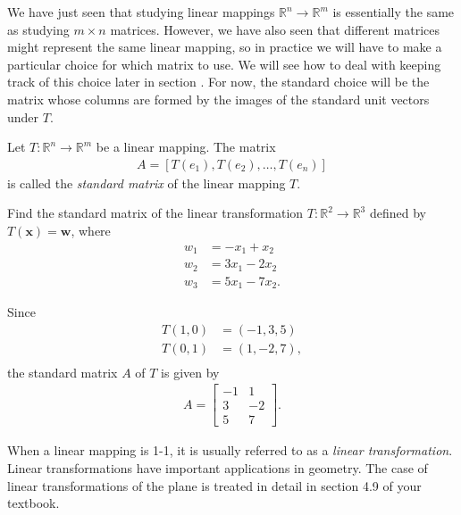 \documentclass[12pt,letterpaper,reqno]{article}
\numberwithin{equation}{section}
\newcommand{\fixme}[1]{{\color{orange}{[#1]}}}
\begin{document}
We have just seen that studying linear mappings $\mathbb{R}^n \to \mathbb{R}^m$ is essentially the same as studying $m \times n$ matrices. However, we have also seen that different matrices might represent the same linear mapping, so in practice we will have to make a particular choice for which matrix to use. We will see how to deal with keeping track of this choice later in section \fixme{Add link.}. For now, the standard choice will be the matrix whose columns are formed by the images of the standard unit vectors under $T$.

\begin{defn}
	Let $T:\mathbb{R}^n \to \mathbb{R}^m$ be a linear mapping. The matrix 
	\begin{align*}
		A=\left[T(e_1),T(e_2),\dots,T(e_n)\right]
	\end{align*}
	is called the \emph{standard matrix} of the linear mapping $T$.
\end{defn}

\begin{exercise}
Find the standard matrix of the linear transformation $T:\mathbb{R}^2 \to \mathbb{R}^3$ defined by $T(\mathbf{x})=\mathbf{w}$, where
\begin{align*}
	w_1&=-x_1+x_2 \\
	w_2&=3x_1-2x_2 \\
	w_3&=5x_1-7x_2.
\end{align*}	
\end{exercise}

{\color{red}
\begin{solution}
	Since
	\begin{align*}
		T(1,0)&=(-1,3,5) \\
		T(0,1)&=(1,-2,7), \\
	\end{align*}
	the standard matrix $A$ of $T$ is given by
	\begin{align*}
		A=\begin{bmatrix}
			-1 & 1 \\
			3 & -2 \\
			5 & 7
		\end{bmatrix}.
	\end{align*}
\end{solution}}

When a linear mapping is 1-1, it is usually referred to as a \emph{linear transformation}. Linear transformations have important applications in geometry. The case of linear transformations of the plane is treated in detail in section 4.9 of your textbook.
\end{document}
